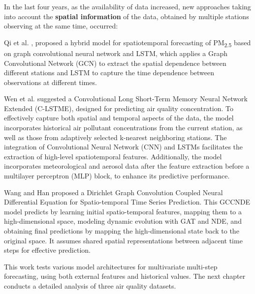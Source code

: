 In the last four years, as the availability of data increased, new approaches taking into account the \textbf{spatial information} of the data, obtained by multiple stations observing at the same time, occurred:

\noindent Qi et al. \cite{graphlstm1}, proposed a hybrid model for spatiotemporal forecasting of PM\textsubscript{2.5} based on graph convolutional neural network and LSTM, which applies a Graph Convolutional Network (GCN) to extract the spatial dependence between different stations and LSTM to capture the time dependence between observations at different times. 

\noindent Wen et al. \cite{WEN20191091} suggested a Convolutional Long Short-Term Memory Neural Network Extended (C-LSTME), designed for predicting air quality concentration. To effectively capture both spatial and temporal aspects of the data, the model incorporates historical air pollutant concentrations from the current station, as well as those from adaptively selected k-nearest neighboring stations. The integration of Convolutional Neural Network (CNN) and LSTMs facilitates the extraction of high-level spatiotemporal features. Additionally, the model incorporates meteorological and aerosol data after the feature extraction before a multilayer perceptron (MLP) block, to enhance its predictive performance.

\noindent Wang and Han \cite{Wang2023} proposed a Dirichlet Graph Convolution Coupled Neural Differential Equation for Spatio-temporal Time Series Prediction. This GCCNDE model predicts by learning initial spatio-temporal features, mapping them to a high-dimensional space, modeling dynamic evolution with GAT and NDE, and obtaining final predictions by mapping the high-dimensional state back to the original space. It assumes shared spatial representations between adjacent time steps for effective prediction.

This work tests various model architectures for multivariate multi-step forecasting, using both external features and historical values. The next chapter conducts a detailed analysis of three air quality datasets.
\newpage


















